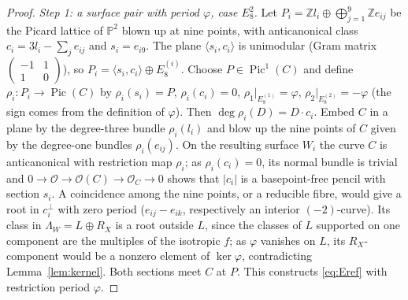\documentclass[12pt]{article}
\newcommand{\Z}{\mathbb Z}
\newcommand{\PP}{\mathbb P}
\newcommand{\Pic}{\operatorname{Pic}}
\theoremstyle{definition}
\theoremstyle{remark}
\begin{document}
\begin{proof}
\emph{Step 1: a surface pair with period \(\varphi\), case \(E_8^2\).}
Let \(P_i=\Z l_i\oplus\bigoplus_{j=1}^9\Z e_{ij}\) be the Picard
lattice of \(\PP^2\) blown up at nine points, with anticanonical class
\(c_i=3l_i-\sum_je_{ij}\) and \(s_i=e_{i9}\). The plane
\(\langle s_i,c_i\rangle\) is unimodular (Gram matrix
\(\left(\begin{smallmatrix}-1&1\\1&0\end{smallmatrix}\right)\)), so
\(P_i=\langle s_i,c_i\rangle\oplus E_8^{(i)}\). Choose \(P\in\Pic^1(C)\)
and define \(\rho_i\colon P_i\to\Pic(C)\) by \(\rho_i(s_i)=P\),
\(\rho_i(c_i)=0\), \(\rho_1|_{E_8^{(1)}}=\varphi\),
\(\rho_2|_{E_8^{(2)}}=-\varphi\) (the sign comes from the definition
of \(\varphi\)).
Then \(\deg\rho_i(D)=D\cdot c_i\). Embed \(C\) in a plane by the
degree-three bundle \(\rho_i(l_i)\) and blow up the nine points of
\(C\) given by the degree-one bundles \(\rho_i(e_{ij})\). On the
resulting surface \(W_i\) the curve \(C\) is anticanonical with
restriction map \(\rho_i\); as \(\rho_i(c_i)=0\), its normal bundle is
trivial and \(0\to\mathcal O\to\mathcal O(C)\to\mathcal O_C\to0\)
shows that \(|c_i|\) is a basepoint-free pencil with section \(s_i\).
A coincidence among the nine points, or a reducible fibre, would give
a root in \(c_i^\perp\) with zero period (\(e_{ij}-e_{ik}\),
respectively an interior \((-2)\)-curve). Its class in
\(\Lambda_W=L\oplus R_X\) is a root outside \(L\), since the classes
of \(L\) supported on one component are the multiples of the
isotropic \(f\); as \(\varphi\) vanishes on \(L\), its
\(R_X\)-component would be a nonzero element of \(\ker\varphi\),
contradicting Lemma~\ref{lem:kernel}. Both sections meet \(C\) at
\(P\). This constructs \eqref{eq:Eref} with restriction period
\(\varphi\).


\end{proof}
\end{document}
